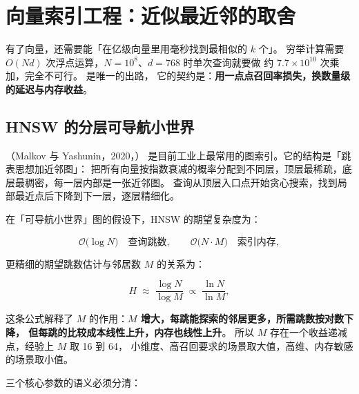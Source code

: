 \section{向量索引工程：近似最近邻的取舍}

有了向量，还需要能「在亿级向量里用毫秒找到最相似的 $k$ 个」。
穷举计算需要 $O(N d)$ 次浮点运算，$N = 10^8$、$d = 768$ 时单次查询就要做
约 $7.7 \times 10^{10}$ 次乘加，完全不可行。
 是唯一的出路，
它的契约是：\textbf{用一点点召回率损失，换数量级的延迟与内存收益}。

\subsection{HNSW 的分层可导航小世界}

（Malkov 与 Yashunin，2020，\cite{malkov2020hnsw}）
是目前工业上最常用的图索引。它的结构是「跳表思想加近邻图」：
把所有向量按指数衰减的概率分配到不同层，顶层最稀疏，底层最稠密，每一层内部是一张近邻图。
查询从顶层入口点开始贪心搜索，找到局部最近点后下降到下一层，逐层精细化。

在「可导航小世界」图的假设下，HNSW 的期望复杂度为：

\begin{equation}
\mathcal{O}\big(\log N\big) \quad \text{查询跳数}, \qquad
\mathcal{O}\big(N \cdot M\big) \quad \text{索引内存} ,
\label{eq:hnsw-complexity}
\end{equation}

更精细的期望跳数估计与邻居数 $M$ 的关系为：

\begin{equation}
H \;\approx\; \frac{\log N}{\log M} \;\propto\; \frac{\ln N}{\ln M} ,
\label{eq:hnsw-hops}
\end{equation}

这条公式解释了 $M$ 的作用：\textbf{$M$ 增大，每跳能探索的邻居更多，所需跳数按对数下降，
但每跳的比较成本线性上升，内存也线性上升}。
所以 $M$ 存在一个收益递减点，经验上 $M$ 取 16 到 64，
小维度、高召回要求的场景取大值，高维、内存敏感的场景取小值。

三个核心参数的语义必须分清：

